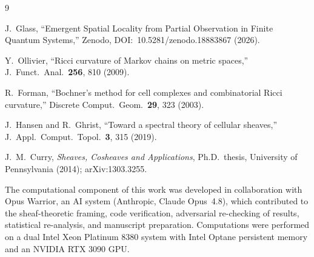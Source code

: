 \documentclass[aps,pra,twocolumn,superscriptaddress,floatfix]{revtex4-2}
\theoremstyle{definition}
\begin{document}
\begin{thebibliography}{9}

J.~Glass,
``Emergent Spatial Locality from Partial Observation in Finite Quantum
Systems,''
Zenodo, DOI:~10.5281/zenodo.18883867 (2026).

Y.~Ollivier,
``Ricci curvature of Markov chains on metric spaces,''
J.\ Funct.\ Anal.\ \textbf{256}, 810 (2009).

R.~Forman,
``Bochner's method for cell complexes and combinatorial Ricci curvature,''
Discrete Comput.\ Geom.\ \textbf{29}, 323 (2003).

J.~Hansen and R.~Ghrist,
``Toward a spectral theory of cellular sheaves,''
J.\ Appl.\ Comput.\ Topol.\ \textbf{3}, 315 (2019).

J.~M.~Curry,
\emph{Sheaves, Cosheaves and Applications},
Ph.D.\ thesis, University of Pennsylvania (2014);
arXiv:1303.3255.

\end{thebibliography}

\begin{acknowledgments}
The computational component of this work was developed in collaboration with Opus Warrior, an AI system (Anthropic, Claude Opus~4.8), which contributed to the sheaf-theoretic framing, code verification, adversarial re-checking of results, statistical re-analysis, and manuscript preparation. Computations were performed on a dual Intel Xeon Platinum 8380 system with Intel Optane persistent memory and an NVIDIA RTX 3090 GPU.
\end{acknowledgments}
\end{document}

